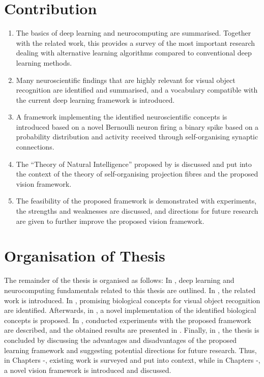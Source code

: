 \section{Contribution}
\begin{enumerate}
	\item The basics of deep learning and neurocomputing are summarised. Together with the related work, this provides a survey of the most important research dealing with alternative learning algorithms compared to conventional deep learning methods.
    \item Many neuroscientific findings that are highly relevant for visual object recognition are identified and summarised, and a vocabulary compatible with the current deep learning framework is introduced.
    \item A framework implementing the identified neuroscientific concepts is introduced based on a novel Bernoulli neuron firing a binary spike based on a probability distribution and activity received through self-organising synaptic connections. 
	\item The ``Theory of Natural Intelligence'' proposed by  is discussed and put into the context of the theory of self-organising projection fibres  and the proposed vision framework.
    \item The feasibility of the proposed framework is demonstrated with experiments, the strengths and weaknesses are discussed, and directions for future research are given to further improve the proposed vision framework.
\end{enumerate}


\section{Organisation of Thesis}
The remainder of the thesis is organised as follows: In , deep learning and neurocomputing fundamentals related to this thesis are outlined.
In , the related work is introduced. In , promising biological concepts for visual object recognition are identified.
Afterwards, in , a novel implementation of the identified biological concepts is proposed.
In , conducted experiments with the proposed framework are described, and the obtained results are presented in .
Finally, in , the thesis is concluded by discussing the advantages and disadvantages of the proposed learning framework and suggesting potential directions for future research.
Thus, in Chapters -, existing work is surveyed and put into context, while in Chapters -, a novel vision framework is introduced and discussed.
